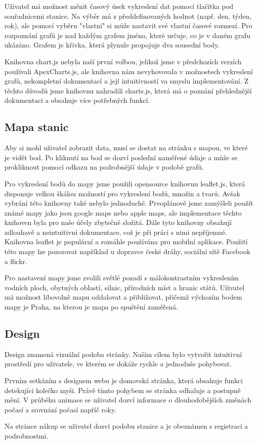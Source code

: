 Uživatel má možnost měnit časový úsek vykreslení dat pomocí tlačítka pod souřadnicemi stanice. Na výběr má z předdefinovaných hodnot (např. den, týden, rok), ale pomocí vyběru "vlastní" si může nastavit své vlastní časové rozmezí.
Pro rozpoznání grafů je nad každým grafem jméno, které určuje, co je v daném grafu ukázáno. Grafem je křivka, která plynule propojuje dva sousední body.  

Knihovna chart.js nebyla naší první volbou, jelikož jsme v předchozích verzích používali ApexCharts.js, ale knihovna nám nevyhovovala v možnostech vykreslení grafů, nekompletní dokumentací a její intuitivností va smyslu implementování.
Z těchto důvodů jsme knihovnu nahradili charts.js, která má o poznání přehlednější dokumentaci a obsahuje více potřebných funkcí.

\subsection{Mapa stanic}
Aby si mohl uživatel zobrazit data, musí se dostat na stránku s mapou, ve které je vidět bod. Po kliknutí na bod se dozví poslední naměřené údaje a může se prokliknout pomocí odkazu na podrobnější údaje v podobě grafů.

Pro vykreslení bodů do mapy jsme použili opensource knihovnu leaflet.js, která disponuje velkou škálou možností pro vykreslení bodů, množin a tvarů.
Avšak vybrání této knihovny také nebylo jednoduché. Prvoplánově jsme zamýšleli použít známé mapy jako jsou google maps nebo apple maps, ale implementace těchto knihoven byla pro naše účely zbytečně složitá. Dále tyto knihovny obsahují zdlouhavě a neintuitivní dokumentace, což je při práci s nimi nepříjemné.
Knihovna leaflet je populární a rozsáhle používána pro mobilní aplikace. Použití této mapy lze pozorovat například u dopravce české dráhy, sociální sítě Facebook a flickr.

Pro nastavení mapy jsme zvolili světlé pozadí s málokontrastním vykreslením vodních ploch, obytných oblastí, silnic, přírodních míst a hranic států. Uživatel má možnost libovolně mapu oddalovat a přibližovat, přičemž výchozím bodem mapy je Praha, na kterou je mapa po spuštění zaměřená.

\subsection{Design}
Design znamená vizuální podoba stránky.
Naším cílem bylo vytvořit intuitivní prostředí pro uživatele, ve kterém se dokáže rychle a jednoduše pohybovat.

Prvním setkáním s designem webu je domovská stránka, která obsahuje funkci detekujíci kolečko myši.
Právě tímto pohybem se stránka odhaluje a postupně mění. V průběhu animace se uživatel dozví informace o dlouhodobějších změnách počasí a srovnání počasí napříč roky.

Na stránce nákup se uživatel dozví podobu stanice a je obeznámen s registrací a podrobnostmi.
